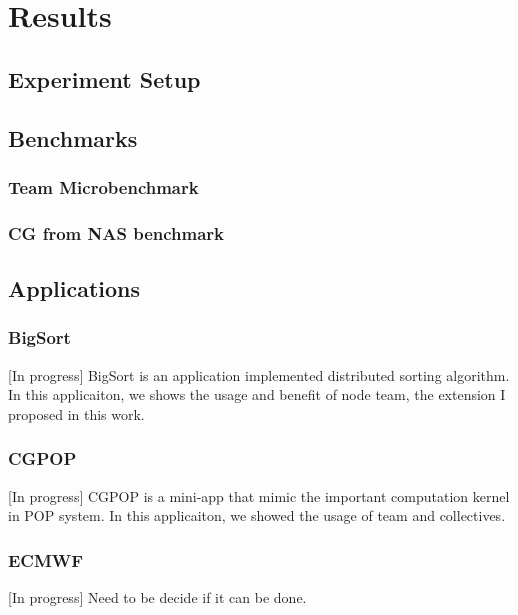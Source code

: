 \chapter{Results}\label{chap:Results}
\section{Experiment Setup}
\section{Benchmarks}
\subsection{Team Microbenchmark}
\subsection{CG from NAS benchmark}

\section{Applications}
\subsection{BigSort}
[In progress]
BigSort is an application implemented distributed sorting algorithm. In this applicaiton, we shows the usage and benefit of node team, the extension I proposed in this work. 
\subsection{CGPOP}
[In progress]
CGPOP is a mini-app that mimic the important computation kernel in POP system. In this applicaiton, we showed the usage of team and collectives. 
\subsection{ECMWF}
[In progress]
Need to be decide if it can be done. 

